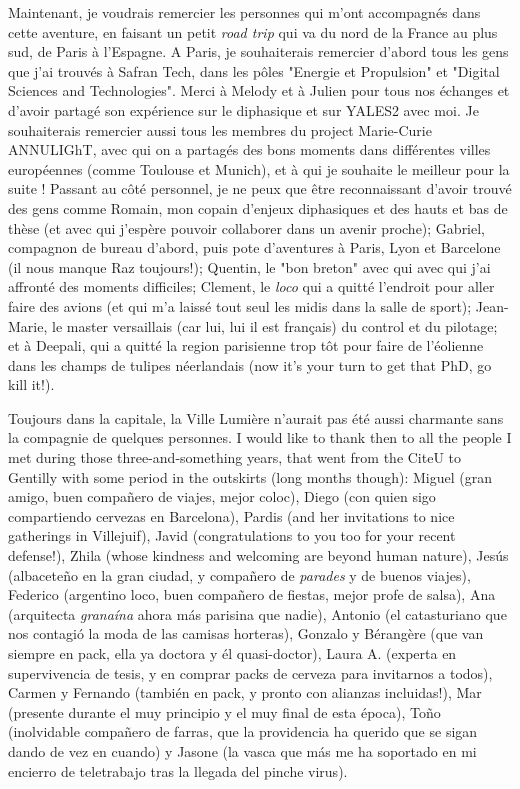 Maintenant, je voudrais remercier les personnes qui m'ont accompagnés dans cette aventure, en faisant un petit \textsl{road trip} qui va du nord de la France au plus sud, de Paris à l'Espagne. A Paris, je souhaiterais remercier d'abord tous les gens que j'ai trouvés à Safran Tech, dans les pôles "Energie et Propulsion" et "Digital Sciences and Technologies". Merci à Melody et à Julien pour tous nos échanges et d'avoir partagé son expérience sur le diphasique et sur YALES2 avec moi. Je souhaiterais remercier aussi tous les membres du project Marie-Curie ANNULIGhT, avec qui on a partagés des bons moments dans différentes villes européennes (comme Toulouse et Munich), et à qui je souhaite le meilleur pour la suite ! Passant au côté personnel, je ne peux que être reconnaissant d'avoir trouvé des gens comme Romain, mon copain d'enjeux diphasiques et des hauts et bas de thèse (et avec qui j'espère pouvoir collaborer dans un avenir proche); Gabriel, compagnon de bureau d'abord, puis pote d'aventures à Paris, Lyon et Barcelone (il nous manque Raz toujours!); Quentin, le "bon breton" avec qui avec qui j'ai affronté des moments difficiles; Clement, le \textsl{loco} qui a quitté l'endroit pour aller faire des avions (et qui m'a laissé tout seul les midis dans la salle de sport); Jean-Marie, le master versaillais (car lui, lui il est français) du control et du pilotage; et à Deepali, qui a quitté la region parisienne trop tôt pour faire de l'éolienne dans les champs de tulipes néerlandais (now it's your turn to get that PhD, go kill it!).
  
Toujours dans la capitale, la Ville Lumière n'aurait pas été aussi charmante sans la compagnie de quelques personnes. I would like to thank then to all the people I met during those three-and-something years, that went from the CiteU to Gentilly with some period in the outskirts (long months though): Miguel (gran amigo, buen compañero de viajes, mejor coloc), Diego (con quien sigo compartiendo cervezas en Barcelona), Pardis (and her invitations to nice gatherings in Villejuif), Javid (congratulations to you too for your recent defense!), Zhila (whose kindness and welcoming are beyond human nature), Jesús (albaceteño en la gran ciudad, y compañero de \textsl{parades} y de buenos viajes), Federico (argentino loco, buen compañero de fiestas, mejor profe de salsa), Ana (arquitecta \textsl{granaína} ahora más parisina que nadie), Antonio (el catasturiano que nos contagió la moda de las camisas horteras), Gonzalo y Bérangère (que van siempre en pack, ella ya doctora y él quasi-doctor), Laura A. (experta en supervivencia de tesis, y en comprar packs de cerveza para invitarnos a todos), Carmen y Fernando (también en pack, y pronto con alianzas incluidas!), Mar (presente durante el muy principio y el muy final de esta época), Toño (inolvidable compañero de farras, que la providencia ha querido que se sigan dando de vez en cuando) y Jasone (la vasca que más me ha soportado en mi encierro de teletrabajo tras la llegada del pinche virus).

